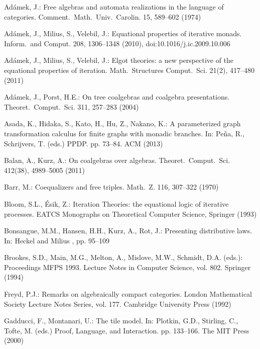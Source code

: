 \documentclass[oribibl,envcountsame,envcountsect,runningheads]{llncs}
\renewcommand{\>}{\rangle}
\begin{document}

\begin{thebibliography}{10}
\providecommand{\url}[1]{\texttt{#1}}
\providecommand{\urlprefix}{URL }

Ad\'{a}mek, J.: Free algebras and automata realizations in the language of
  categories. Comment.~Math.~Univ.~Carolin.  15,  589--602 (1974)

Ad\'amek, J., Milius, S., Velebil, J.: Equational properties of iterative
  monads. Inform.~and Comput.  208,  1306--1348 (2010),
  doi:10.1016/j.ic.2009.10.006

Ad\'amek, J., Milius, S., Velebil, J.: Elgot theories: a new perspective of the
  equational properties of iteration. Math.~Structures Comput.~Sci.  21(2),
  417--480 (2011)

Ad\'amek, J., Porst, H.E.: On tree coalgebras and coalgebra presentations.
  Theoret.~Comput.~Sci.  311,  257--283 (2004)

Asada, K., Hidaka, S., Kato, H., Hu, Z., Nakano, K.: A parameterized graph
  transformation calculus for finite graphs with monadic branches. In:
  Pe{\~n}a, R., Schrijvers, T. (eds.) PPDP. pp. 73--84. ACM (2013)

Balan, A., Kurz, A.: On coalgebras over algebras. Theoret.~Comput.~Sci. 412(38),
   4989--5005 (2011)

Barr, M.: Coequalizers and free triples. Math.~Z.  116,  307--322 (1970)

Bloom, S.L., \'Esik, Z.: Iteration Theories: the equational logic of iterative
  processes. EATCS Monographs on Theoretical Computer Science, Springer (1993)

Bonsangue, M.M., Hansen, H.H., Kurz, A., Rot, J.: Presenting distributive laws.
  In: Heckel and Milius  \cite{DBLP:conf/calco/2013}, pp. 95--109

Brookes, S.D., Main, M.G., Melton, A., Mislove, M.W., Schmidt, D.A. (eds.): Proceedings MFPS 1993. Lecture
  Notes in Computer Science, vol. 802. Springer (1994)

Freyd, P.J.: Remarks on algebraically compact categories. London Mathematical Society Lecture Notes
  Series, vol. 177. Cambridge University Press (1992)

Gadducci, F., Montanari, U.: The tile model. In: Plotkin, G.D., Stirling, C.,
  Tofte, M. (eds.) Proof, Language, and Interaction. pp. 133--166. The MIT
  Press (2000)


\end{thebibliography}
\end{document}
